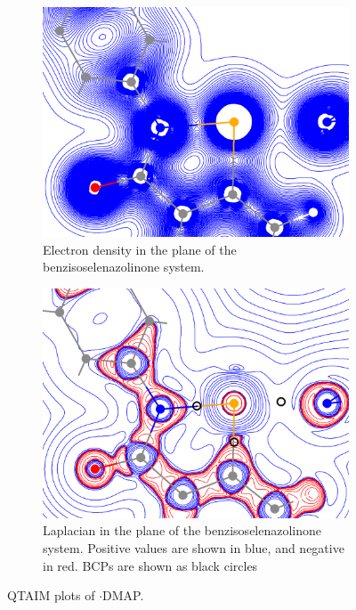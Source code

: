 \begin{refsection}
\begin{figure}
  \begin{subfigure}[t]{0.45\linewidth}
    \centering
    \includegraphics[width=\linewidth]{Figures/ebs-dmap-rho.png}
    \caption{Electron density in the plane of the benzisoselenazolinone system.}
  \end{subfigure}
  \hfill
  \begin{subfigure}[t]{0.45\linewidth}
    \centering
    \includegraphics[width=\linewidth]{Figures/ebs-dmap-lapl.png}
    \caption{Laplacian in the plane of the benzisoselenazolinone system. Positive values are shown in blue, and negative in red. BCPs are shown as black circles}
  \end{subfigure}
  \caption{QTAIM plots of $\cdot$DMAP.}\label{fig:ebs-dmap-qtaim}
\end{figure}


\end{refsection}
